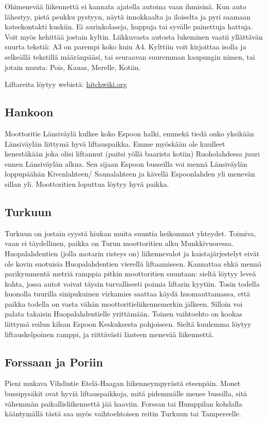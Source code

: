 \documentclass[../ala_hataile.tex]{subfiles}
\begin{document}
Ohimenevää liikennettä ei kannata
ajatella autoina vaan ihmisinä. Kun auto
lähestyy, pistä peukku pystyyn, näytä innokkaalta
ja iloiselta ja pyri saamaan katsekontakti
kuskiin. Ei aurinkolaseja, huppuja
tai syvälle painettuja hattuja. Voit myös
kehittää jostain kyltin. Liikkuvasta autosta
lukeminen
vaatii yllättävän suurta tekstiä:
A3 on parempi koko kuin A4. Kylttiin voit
kirjoittaa isolla ja selkeällä tekstillä määränpääsi,
tai seuraavan suuremman kaupungin nimen,
tai jotain muuta: Pois, Kauas, Merelle,
Kotiin.

\noindent Liftareita löytyy webistä: \url{hitchwiki.org}
\subsection*{Hankoon}
Moottoritie Länsiväylä kulkee koko Espoon
halki, emmekä tiedä onko yksikään
Länsiväylän liittymä hyvä liftauspaikka.
Emme myöskään ole kuulleet kenestäkään
joka olisi liftannut (paitsi yöllä baarista
kotiin) Ruoholahdessa juuri ennen Länsiväylän
alkua. Sen sijaan Espoon busseilla
voi mennä Länsiväylän loppupäähän Kivenlahteen/
Saunalahteen ja kävellä Espoonlahden
yli menevän sillan yli. Moottoritien
loputtua löytyy hyvä paikka.
\subsection*{Turkuun}
Turkuun on jostain syystä hiukan muita
suuntia heikommat yhteydet. Toimiva,
vaan ei täydellinen, paikka on Turun
moottoritien alku Munkkivuoressa. Huopalahdentien
(jolla motarin risteys on)
liikennevalot ja kaistajärjestelyt eivät ole
kovin suotuisia Huopalahdentien vierellä
liftaamiseen. Kannattaa ehkä mennä parikymmentä
metriä ramppia pitkin moottoritien
suuntaan: sieltä löytyy leveä kohta,
jossa autot voivat täysin turvallisesti poimia
liftarin kyytiin. Tosin todella huonolla
tuurilla sinipukuinen virkamies saattaa
käydä huomauttamassa, että paikka todella
on vasta vähän moottori\-tie\-liikenne\-merkin
jälkeen. Silloin voi palata takaisin Huopa\-lahden\-tielle
yrittämään. Toinen vaihtoehto
on kookas liittymä reilun kilsan Espoon
Keskuksesta pohjoiseen.
Sieltä kuulemma
löytyy liftauskelpoinen
ramppi, ja riittävästi
länteen menevää liikennettä.
\subsection*{Forssaan ja Poriin}
Pieni mukava Vihdintie Etelä-Haagan
liikenneympyrästä eteenpäin. Monet bussipysäkit
ovat hyviä liftauspaikkoja, mitä pidemmälle
menee bussilla, sitä vähemmän
paikallisliikennettä jää haaviin. Forssan
tai Humppilan kohdalla kääntymällä
tästä
saa myös vaihtoehtoisen reitin Turkuun tai
Tampereelle.
\end{document}
